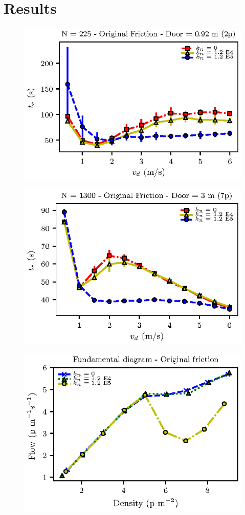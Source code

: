 \documentclass[preprint,12pt]{elsarticle}
\begin{document}
\section{\label{results}Results}



\begin{figure}[htbp!]
\centering
\includegraphics[width=0.7\columnwidth]
{./vd_vs_te_N225.eps}
\caption{\label{} }
\end{figure}


\begin{figure}[htbp!]
\centering
\includegraphics[width=0.7\columnwidth]
{./vd_vs_te_ck.eps}
\caption{\label{} }
\end{figure}


\begin{figure}[htbp!]
\centering
\includegraphics[width=0.7\columnwidth]
{./flow-density_vd1_multi_kn.eps}
\caption{\label{} }
\end{figure}
\end{document}
